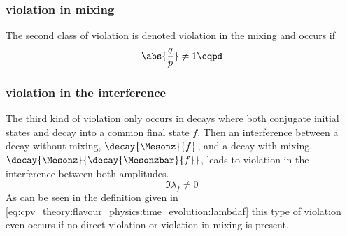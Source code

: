 \subsubsection[\CP violation in mixing]{\CPbfsf violation in mixing}
\label{sec:cpv_theory:flavour_physics:cpv_classification:mixing}

The second class of \CP violation is denoted \CP violation in the mixing and
occurs if
%
\begin{equation}
  \abs{\frac{q}{p}} \neq 1 \eqpd
\end{equation}
%

\subsubsection[\CP violation in the interference]{\CPbfsf violation in the interference}
\label{sec:cpv_theory:flavour_physics:cpv_classification:interference}

The third kind of \CP violation only occurs in decays where both \CP conjugate
initial states \Mesonz and \Mesonzbar decay into a common final state $f$. Then
an interference between a decay without mixing, $\decay{\Mesonz}{f}$, and a
decay with mixing, $\decay{\Mesonz}{\decay{\Mesonzbar}{f}}$, leads to \CP
violation in the interference between both amplitudes.
%
\begin{equation}
  \Im \lambda_f \neq 0   
\end{equation}
%
As can be seen in the definition given in
\cref{eq:cpv_theory:flavour_physics:time_evolution:lambdaf} this type of \CP
violation even occurs if no direct \CP violation or \CP violation in mixing is
present.

